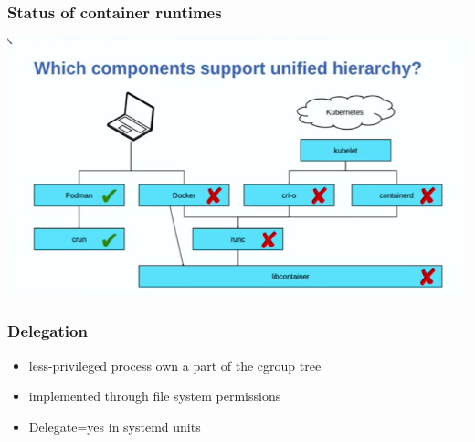 \documentclass[serif]{beamer}
\begin{document}


\begin{frame}
  \frametitle{Status of container runtimes}

  \includegraphics[width=\textwidth]{images/container-runtime-status.png}
\end{frame}

\begin{frame}
  \frametitle{Delegation}

  \begin{itemize}
  \item less-privileged process own a part of the cgroup tree
  \item implemented through file system permissions
  \item Delegate=yes in systemd units
  \end{itemize}
\end{frame}
\end{document}
